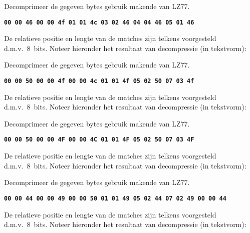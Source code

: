 \documentclass{ucll-exam}
\newcommand{\hex}[1]{\texttt{\bfseries #1}}
\begin{document}
\begin{question}
  Decomprimeer de gegeven bytes gebruik makende van LZ77.
  \begin{center}
    \hex{00 00 46 00 00 4f 01 01 4c 03 02 46 04 04 46 05 01 46}
  \end{center}
  De relatieve positie en lengte van de matches zijn telkens voorgesteld d.m.v.~8~bits.
  Noteer hieronder het resultaat van decompressie (in tekstvorm):
  \vskip5mm
  \begin{center}
  \end{center}
\end{question}

\begin{question}
  Decomprimeer de gegeven bytes gebruik makende van LZ77.
  \begin{center}
    \hex{00 00 50 00 00 4f 00 00 4c 01 01 4f 05 02 50 07 03 4f}
  \end{center}
  De relatieve positie en lengte van de matches zijn telkens voorgesteld d.m.v.~8~bits.
  Noteer hieronder het resultaat van decompressie (in tekstvorm):
  \vskip5mm
  \begin{center}
  \end{center}
\end{question}

\begin{question}
  Decomprimeer de gegeven bytes gebruik makende van LZ77.
  \begin{center}
    \hex{00 00 50 00 00 4F 00 00 4C 01 01 4F 05 02 50 07 03 4F}
  \end{center}
  De relatieve positie en lengte van de matches zijn telkens voorgesteld d.m.v.~8~bits.
  Noteer hieronder het resultaat van decompressie (in tekstvorm):
  \vskip5mm
  \begin{center}
  \end{center}
\end{question}

\begin{question}
  Decomprimeer de gegeven bytes gebruik makende van LZ77.
  \begin{center}
    \hex{00 00 44 00 00 49 00 00 50 01 01 49 05 02 44 07 02 49 00 00 44}
  \end{center}
  De relatieve positie en lengte van de matches zijn telkens voorgesteld d.m.v.~8~bits.
  Noteer hieronder het resultaat van decompressie (in tekstvorm):
  \vskip5mm
  \begin{center}
  \end{center}
\end{question}
\end{document}
